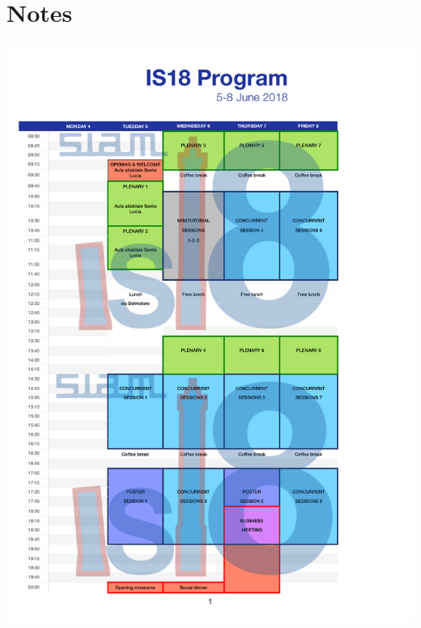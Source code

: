 \documentclass[10pt, a4paper]{book}
\begin{document}
\part{Notes}
\newpage
\thispagestyle{empty}
\includegraphics[scale=0.6]{program_table.pdf}
%
%
\end{document}
